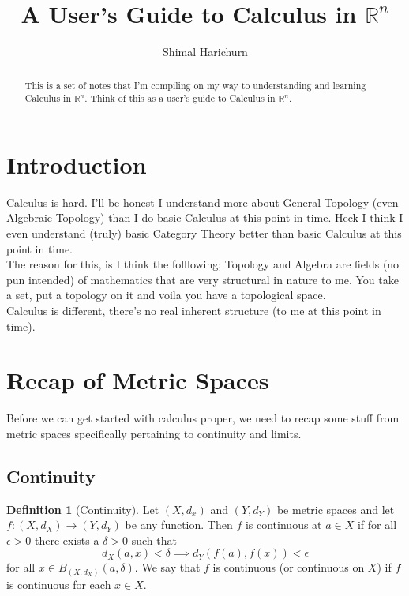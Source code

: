 \documentclass[12pt]{article}
\title{A User's Guide to Calculus in $\mathbb{R}^n$}
\author{Shimal Harichurn}
\theoremstyle{definition}
\newtheorem{definition}{Definition}[section]
\numberwithin{theorem}{subsection}
\numberwithin{corollary}{subsection}
\theoremstyle{remark}
\theoremstyle{point}
\begin{document}
	\maketitle
	\begin{abstract}
		\begin{center}
			This is a set of notes that I'm compiling on my way to understanding and learning Calculus in $\mathbb{R}^n$. Think of this as a user's guide to Calculus in $\mathbb{R}^n$.
		\end{center}
	\end{abstract}
	
	\section{Introduction}
		
	Calculus is hard. I'll be honest I understand more about General Topology (even Algebraic Topology) than I do basic Calculus at this point in time. Heck I think I even understand (truly) basic Category Theory better than basic Calculus at this point in time. \\
		
	The reason for this, is I think the folllowing; Topology and Algebra are fields (no pun intended) of mathematics that are very structural in nature to me. You take a set, put a topology on it and voila you have a topological space. \\
			
	Calculus is different, there's no real inherent structure (to me at this point in time).
	\newpage
	
	\section{Recap of Metric Spaces}
	Before we can get started with calculus proper, we need to recap some stuff from metric spaces specifically pertaining to continuity and limits. 
	
	\subsection{Continuity}  
	
	
	\begin{definition}[Continuity]
		Let $(X, d_x)$ and $(Y, d_Y)$ be metric spaces and let $f : (X, d_X) \to (Y, d_Y)$ be any function. Then $f$ is continuous at $a \in X$ if for all  $\epsilon > 0$ there exists a $\delta > 0$ such that $$d_X(a, x) < \delta \implies d_Y\left(f(a), f(x) \right) < \epsilon$$ for all $x \in B_{(X, d_X)}(a, \delta)$.  We say that $f$ is continuous (or continuous on $X$) if $f$ is continuous for each $x \in X$.
	\end{definition}
	
\end{document}
